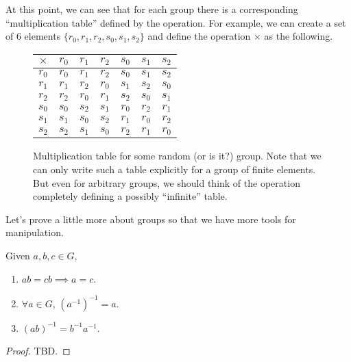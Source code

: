   At this point, we can see that for each group there is a corresponding ``multiplication table'' defined by the operation. For example, we can create a set of $6$ elements $\{r_0, r_1, r_2, s_0, s_1, s_2\}$ and define the operation $\times$ as the following. 

  \begin{figure}[H]
    \centering 
    \begin{tabular}{c|cccccc}
      $\times$ & $r_0$ & $r_1$ & $r_2$ & $s_0$ & $s_1$ & $s_2$ \\
      \hline
      $r_0$ & $r_0$ & $r_1$ & $r_2$ & $s_0$ & $s_1$ & $s_2$ \\
      $r_1$ & $r_1$ & $r_2$ & $r_0$ & $s_1$ & $s_2$ & $s_0$ \\
      $r_2$ & $r_2$ & $r_0$ & $r_1$ & $s_2$ & $s_0$ & $s_1$ \\
      $s_0$ & $s_0$ & $s_2$ & $s_1$ & $r_0$ & $r_2$ & $r_1$ \\
      $s_1$ & $s_1$ & $s_0$ & $s_2$ & $r_1$ & $r_0$ & $r_2$ \\
      $s_2$ & $s_2$ & $s_1$ & $s_0$ & $r_2$ & $r_1$ & $r_0$ \\
    \end{tabular}
    \caption{Multiplication table for some random (or is it?) group. Note that we can only write such a table explicitly for a group of finite elements. But even for arbitrary groups, we should think of the operation completely defining a possibly ``infinite'' table.} 
  \end{figure} 

  \begin{example}
    
  \end{example}

  Let's prove a little more about groups so that we have more tools for manipulation. 

  \begin{lemma}
    Given $a, b, c \in G$, 
    \begin{enumerate}
      \item $ab = cb \implies a = c$. 
      \item $\forall a \in G$, $(a^{-1})^{-1} = a$. 
      \item $(ab)^{-1} = b^{-1} a^{-1}$. 
    \end{enumerate}
  \end{lemma}
  \begin{proof}
    TBD. 
  \end{proof}

